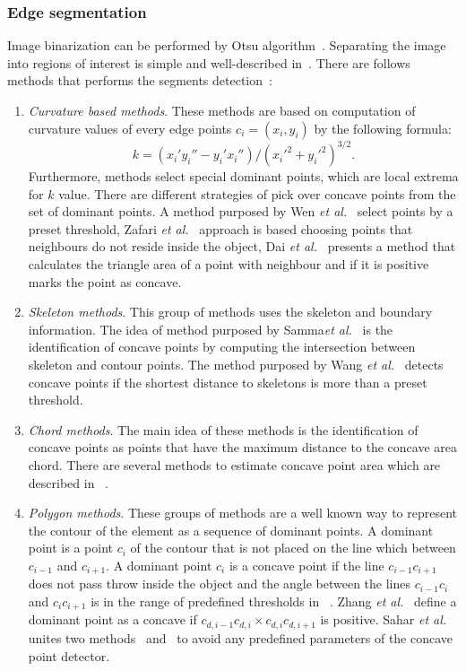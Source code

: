 \documentclass{lutmscthesis}[2010/09/22]
\begin{document}
\subsubsection{Edge segmentation}
Image binarization can be performed by Otsu algorithm~\cite{otsu}. Separating the image into regions of interest is simple and well-described in~\cite{ROI}.
There are follows methods that performs the segments detection~\cite{compare-cpd}:
\begin{enumerate}
    \item \textit{Curvature based methods}. These methods are based on computation of curvature values of every edge points $c_i = (x_i,y_i)$ by the following formula:
        \begin{equation}
            k = (x_i'y_i''-y_i'x_i'') / (x_i'^2+y_i'^2)^{3/2}.
        \end{equation}
        Furthermore, methods select special dominant points, which are local extrema for $k$ value. There are different strategies of pick over concave points from the set of dominant points. A method purposed by Wen \emph{et al.}~\cite{curv-wen}  select points by a preset threshold, Zafari \emph{et al.}~\cite{Zafari15} approach is based choosing points that neighbours do not reside inside the object, Dai \emph{et al.}~\cite{curv-dai} presents a method that calculates the triangle area of a point with neighbour and if it is positive marks the point as concave.
    \item \textit{Skeleton methods}. This group of methods uses the skeleton and boundary information. The idea of method purposed by Samma\emph{et al.}~\cite{bnd-skeleton} is the identification of concave points by computing the intersection between skeleton and contour points. The method purposed by Wang \emph{et al.}~\cite{skeleton} detects concave points if the shortest distance to skeletons is more than a preset threshold.
    \item \textit{Chord methods}. The main idea of these methods is the identification of concave points as points that have the maximum distance to the concave area chord. There are several methods to estimate concave point area which are described in 
    ~\cite{chord-farhan,chord-kumar}.
    \item \textit{Polygon methods}. These groups of methods are a well known way to represent the contour of the element as a sequence of dominant points. A dominant point is a point $c_i$  of the contour that is not placed on the line which between $c_{i-1}$ and $c_{i+1}$. A dominant point $c_i$ is a concave point if the line $c_{i-1}c_{i+1}$ does not pass throw inside the object and the angle between the lines $c_{i-1}c_{i}$ and $c_{i}c_{i+1}$ is in the range of predefined thresholds in~\cite{Bai20092434} . Zhang  \emph{et al.}~\cite{bubble} define a dominant point as a concave if ${c_{d,i-1}c_{d,i}}\times {c_{d,i}c_{d,i+1}}$ is positive. Sahar \emph{et al.}~\cite{compare-cpd} unites two methods~\cite{bubble} and~\cite{Bai20092434} to avoid any predefined parameters of the concave point detector.
\end{enumerate}
\end{document}
